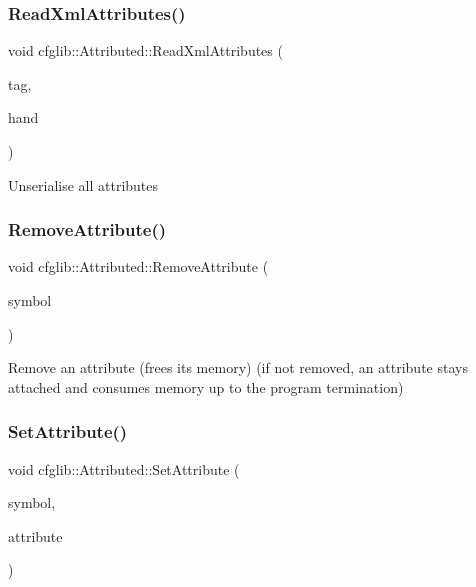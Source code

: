 \subsubsection{\texorpdfstring{Read\+Xml\+Attributes()}{ReadXmlAttributes()}}
{\footnotesize\ttfamily void cfglib\+::\+Attributed\+::\+Read\+Xml\+Attributes (\begin{DoxyParamCaption}\item[{\hyperlink{classXmlTag}{Xml\+Tag} const $\ast$}]{tag,  }\item[{\hyperlink{classcfglib_1_1Handle}{Handle} \&}]{hand }\end{DoxyParamCaption})}

Unserialise all attributes \mbox{\label{classcfglib_1_1Attributed_a725edd325af54006acfb25b4cf8760fd}} 
\subsubsection{\texorpdfstring{Remove\+Attribute()}{RemoveAttribute()}}
{\footnotesize\ttfamily void cfglib\+::\+Attributed\+::\+Remove\+Attribute (\begin{DoxyParamCaption}\item[{std\+::string const \&}]{symbol }\end{DoxyParamCaption})}

Remove an attribute (frees its memory) (if not removed, an attribute stays attached and consumes memory up to the program termination) \mbox{\label{classcfglib_1_1Attributed_a354c313adbd2b325718c2e3c3127edc6}} 
\subsubsection{\texorpdfstring{Set\+Attribute()}{SetAttribute()}}
{\footnotesize\ttfamily void cfglib\+::\+Attributed\+::\+Set\+Attribute (\begin{DoxyParamCaption}\item[{std\+::string const \&}]{symbol,  }\item[{\hyperlink{classcfglib_1_1Attribute}{Attribute} \&}]{attribute }\end{DoxyParamCaption})}

